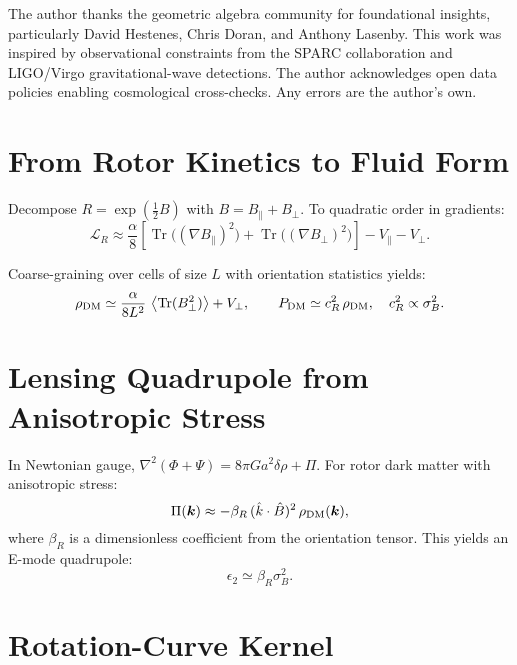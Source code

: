 \documentclass[11pt,a4paper]{article}
\numberwithin{equation}{section}
\theoremstyle{plain}
\theoremstyle{definition}
\theoremstyle{remark}
\DeclareMathOperator{\Tr}{Tr}
\newcommand{\avg}[1]{\left\langle #1 \right\rangle}
\newcommand{\Lag}{\mathcal{L}}              %
\begin{document}
The author thanks the geometric algebra community for foundational insights, particularly David Hestenes, Chris Doran, and Anthony Lasenby. This work was inspired by observational constraints from the SPARC collaboration and LIGO/Virgo gravitational-wave detections. The author acknowledges open data policies enabling cosmological cross-checks. Any errors are the author's own.

\vspace{1em}

\appendix

\section{From Rotor Kinetics to Fluid Form}\label{app:fluid}

Decompose $R=\exp(\tfrac12 B)$ with $B=B_\parallel+B_\perp$. To quadratic order in gradients:
\begin{equation}
\Lag_R \approx \frac{\alpha}{8}\left[\Tr\big((\nabla B_\parallel)^2\big)+\Tr\big((\nabla B_\perp)^2\big)\right]-V_\parallel - V_\perp.
\end{equation}

Coarse-graining over cells of size $L$ with orientation statistics yields:
\begin{equation}
\rho_{\rm DM} \simeq \frac{\alpha}{8L^2}\,\avg{\Tr(B_\perp^2)} + V_\perp,
\qquad
P_{\rm DM}\simeq c_R^2\,\rho_{\rm DM},\quad c_R^2\propto \sigma_B^2.
\end{equation}

\section{Lensing Quadrupole from Anisotropic Stress}\label{app:lensing}

In Newtonian gauge, $\nabla^2(\Phi+\Psi)=8\pi G a^2 \delta\rho + \Pi$. For rotor dark matter with anisotropic stress:
\begin{equation}
\Pi(\bm{k})\approx -\beta_R\,(\hat k\cdot \hat B)^2\,\rho_{\rm DM}(\bm{k}),
\end{equation}
where $\beta_R$ is a dimensionless coefficient from the orientation tensor. This yields an E-mode quadrupole:
\begin{equation}
\epsilon_2\simeq\beta_R \sigma_B^2.
\end{equation}

\section{Rotation-Curve Kernel}\label{app:rc}
\end{document}
